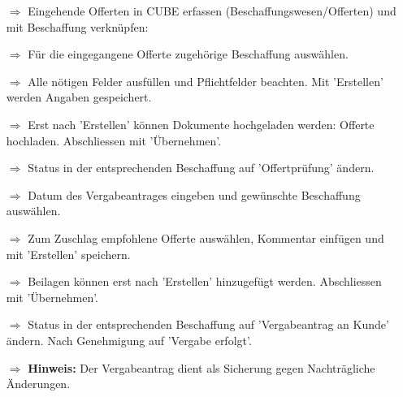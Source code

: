 \documentclass{article}
\begin{document}

\begin{multicols}{2}

\begin{tcolorbox}[colback=blue!5,colframe=blue!40!black,title=(3) Offerte(n) entgegennehmen und prüfen]
\begin{itemize}
  \item[$\Longrightarrow$] Eingehende Offerten in CUBE erfassen (Beschaffungswesen/Offerten) und mit Beschaffung verknüpfen:
	\item[$\Longrightarrow$] Für die eingegangene Offerte zugehörige Beschaffung auswählen.
  \item[$\Longrightarrow$] Alle nötigen Felder ausfüllen und Pflichtfelder beachten. Mit 'Erstellen' werden Angaben gespeichert.
	\item[$\Longrightarrow$] Erst nach 'Erstellen' können Dokumente hochgeladen werden: Offerte hochladen. Abschliessen mit 'Übernehmen'.
	\item[$\Longrightarrow$] Status in der entsprechenden Beschaffung auf 'Offertprüfung' ändern.
\end{itemize}
\end{tcolorbox}


\begin{tcolorbox}[colback=blue!5,colframe=blue!40!black,title=(4) Vergabeantrag ausfüllen]
\begin{itemize}
  \item[$\Longrightarrow$] Datum des Vergabeantrages eingeben und gewünschte Beschaffung auswählen.
  \item[$\Longrightarrow$] Zum Zuschlag empfohlene Offerte auswählen, Kommentar einfügen und mit 'Erstellen' speichern.
  \item[$\Longrightarrow$] Beilagen können erst nach 'Erstellen' hinzugefügt werden. Abschliessen mit 'Übernehmen'.
	\item[$\Longrightarrow$] Status in der entsprechenden Beschaffung auf 'Vergabeantrag an Kunde' ändern. Nach Genehmigung auf 'Vergabe erfolgt'.
	\item[$\Longrightarrow$] \textbf{Hinweis:} Der Vergabeantrag dient als Sicherung gegen Nachträgliche Änderungen.
\end{itemize}
\end{tcolorbox}


\end{multicols}

\end{document}
